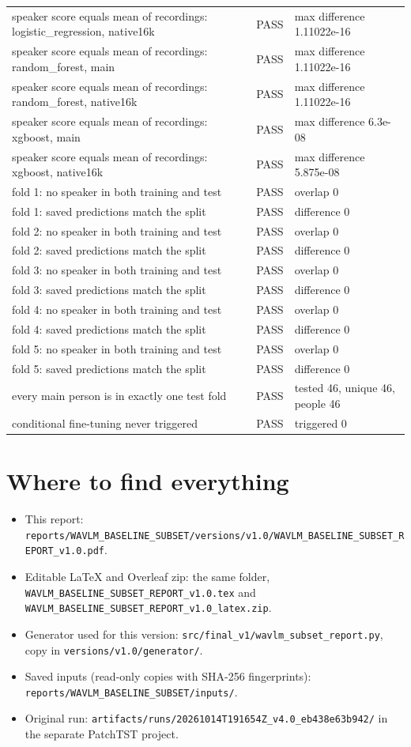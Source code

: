 \documentclass[11pt,a4paper]{article}
\begin{document}
\begin{table}[H]
\begin{tabular}{p{9.5cm}ll}
speaker score equals mean of recordings: logistic\_regression, native16k & PASS & max difference 1.11022e-16\\
speaker score equals mean of recordings: random\_forest, main & PASS & max difference 1.11022e-16\\
speaker score equals mean of recordings: random\_forest, native16k & PASS & max difference 1.11022e-16\\
speaker score equals mean of recordings: xgboost, main & PASS & max difference 6.3e-08\\
speaker score equals mean of recordings: xgboost, native16k & PASS & max difference 5.875e-08\\
fold 1: no speaker in both training and test & PASS & overlap 0\\
fold 1: saved predictions match the split & PASS & difference 0\\
fold 2: no speaker in both training and test & PASS & overlap 0\\
fold 2: saved predictions match the split & PASS & difference 0\\
fold 3: no speaker in both training and test & PASS & overlap 0\\
fold 3: saved predictions match the split & PASS & difference 0\\
fold 4: no speaker in both training and test & PASS & overlap 0\\
fold 4: saved predictions match the split & PASS & difference 0\\
fold 5: no speaker in both training and test & PASS & overlap 0\\
fold 5: saved predictions match the split & PASS & difference 0\\
every main person is in exactly one test fold & PASS & tested 46, unique 46, people 46\\
conditional fine-tuning never triggered & PASS & triggered 0\\
\bottomrule
\end{tabular}\end{table}
\section{Where to find everything}\label{sec:where}
\begin{itemize}\item This report: \texttt{reports/WAVLM\_BASELINE\_SUBSET/versions/v1.0/WAVLM\_BASELINE\_SUBSET\_REPORT\_v1.0.pdf}.
\item Editable LaTeX and Overleaf zip: the same folder, \texttt{WAVLM\_BASELINE\_SUBSET\_REPORT\_v1.0.tex} and \texttt{WAVLM\_BASELINE\_SUBSET\_REPORT\_v1.0\_latex.zip}.
\item Generator used for this version: \texttt{src/final\_v1/wavlm\_subset\_report.py}, copy in \texttt{versions/v1.0/generator/}.
\item Saved inputs (read-only copies with SHA-256 fingerprints): \texttt{reports/WAVLM\_BASELINE\_SUBSET/inputs/}.
\item Original run: \texttt{artifacts/runs/20261014T191654Z\_v4.0\_eb438e63b942/} in the separate PatchTST project.
\end{itemize}
\end{document}
